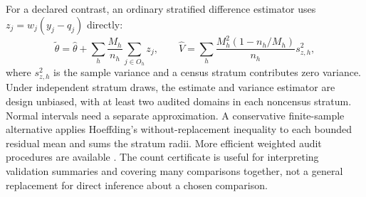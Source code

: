 For a declared contrast, an ordinary stratified difference estimator uses
$z_j=w_j(y_j-q_j)$ directly:
\begin{equation}\label{eq:stratified}
 \widetilde\theta=\widehat\theta+
 \sum_h\frac{M_h}{n_h}\sum_{j\in O_h}z_j,\qquad
 \widehat V=\sum_h\frac{M_h^2(1-n_h/M_h)}{n_h}s_{z,h}^2,
\end{equation}
where $s_{z,h}^2$ is the sample variance and a census stratum contributes zero
variance. Under independent stratum draws, the estimate and variance estimator
are design unbiased, with at least two audited domains in each noncensus
stratum. Normal intervals need a separate approximation. A conservative
finite-sample alternative applies Hoeffding's without-replacement inequality
\citep{hoeffding1963} to each bounded residual mean and sums the stratum radii.
More efficient weighted audit procedures are available \citep{shekhar2023audits}.
The count certificate is useful for interpreting validation summaries and
covering many comparisons together, not a general replacement for direct
inference about a chosen comparison.
